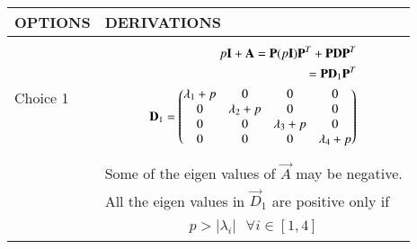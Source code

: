 \begin{table*}[!t]
    \centering
    \begin{tabular}{|l|l|}
    \hline

    \textbf{OPTIONS} & \textbf{DERIVATIONS}\\
    \hline
     Choice 1 & 
      \parbox{12cm}{\begin{align}
         p\mathbf{I}+\mathbf{A}=\mathbf{P}(p\mathbf{I})\mathbf{P}^T+\mathbf{P}\mathbf{D}\mathbf{P}^T\\
   = \mathbf{P}\mathbf{D}_1\mathbf{P}^T\\
    \mathbf{D}_1=\begin{pmatrix}\lambda_1+p&0&0&0\\0&\lambda_2+p&0&0\\0&0&\lambda_3+p&0\\0&0&0&\lambda_4+p\end{pmatrix}
    \end{align}}\\
     & Some of the eigen values of $\vec{A}$ may be negative.\\
     & All the eigen values in $\vec{D}_1$ are positive only if \\
     & \parbox{12cm}{\begin{align}
          p>|\lambda_i|\text{  } \forall i \in [1,4]
     \end{align}}\\
      

\end{tabular}
\end{table*}
